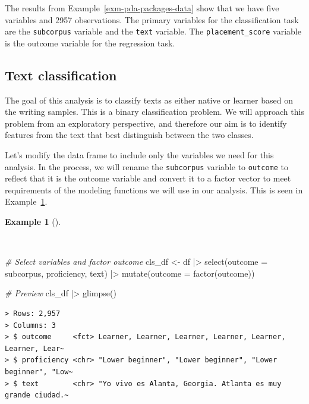 \documentclass[
  letterpaper,
  DIV=11,
  numbers=noendperiod]{scrreprt}
\newenvironment{Shaded}{\begin{snugshade}}{\end{snugshade}}
\newcommand{\AttributeTok}[1]{\textcolor[rgb]{0.00,0.00,0.00}{#1}}
\newcommand{\CommentTok}[1]{\textcolor[rgb]{0.00,0.00,0.00}{\textit{#1}}}
\newcommand{\FunctionTok}[1]{\textcolor[rgb]{0.00,0.00,0.00}{#1}}
\newcommand{\NormalTok}[1]{\textcolor[rgb]{0.00,0.00,0.00}{#1}}
\newcommand{\OtherTok}[1]{\textcolor[rgb]{0.00,0.00,0.00}{#1}}
\newcommand{\SpecialCharTok}[1]{\textcolor[rgb]{0.00,0.00,0.00}{#1}}
\theoremstyle{definition}
\newtheorem{example}{Example}[chapter]
\theoremstyle{remark}
\begin{document}
The results from Example~\ref{exm-pda-packages-data} show that we have
five variables and 2957 observations. The primary variables for the
classification task are the \texttt{subcorpus} variable and the
\texttt{text} variable. The \texttt{placement\_score} variable is the
outcome variable for the regression task.

\subsection{Text classification}\label{sec-pda-text-classification}

The goal of this analysis is to classify texts as either native or
learner based on the writing samples. This is a binary classification
problem. We will approach this problem from an exploratory perspective,
and therefore our aim is to identify features from the text that best
distinguish between the two classes.

Let's modify the data frame to include only the variables we need for
this analysis. In the process, we will rename the \texttt{subcorpus}
variable to \texttt{outcome} to reflect that it is the outcome variable
and convert it to a factor vector to meet requirements of the modeling
functions we will use in our analysis. This is seen in
Example~\ref{exm-pda-class-data}.

\begin{example}[]\protect\hypertarget{exm-pda-class-data}{}\label{exm-pda-class-data}

~

\begin{Shaded}
\begin{Highlighting}[]
\CommentTok{\# Select variables and factor outcome}
\NormalTok{cls\_df }\OtherTok{\textless{}{-}}
\NormalTok{  df }\SpecialCharTok{|\textgreater{}}
  \FunctionTok{select}\NormalTok{(}\AttributeTok{outcome =}\NormalTok{ subcorpus, proficiency, text) }\SpecialCharTok{|\textgreater{}}
  \FunctionTok{mutate}\NormalTok{(}\AttributeTok{outcome =} \FunctionTok{factor}\NormalTok{(outcome))}

\CommentTok{\# Preview}
\NormalTok{cls\_df }\SpecialCharTok{|\textgreater{}} \FunctionTok{glimpse}\NormalTok{()}
\end{Highlighting}
\end{Shaded}

\begin{verbatim}
> Rows: 2,957
> Columns: 3
> $ outcome     <fct> Learner, Learner, Learner, Learner, Learner, Learner, Lear~
> $ proficiency <chr> "Lower beginner", "Lower beginner", "Lower beginner", "Low~
> $ text        <chr> "Yo vivo es Alanta, Georgia. Atlanta es muy grande ciudad.~
\end{verbatim}

\end{example}
\end{document}
